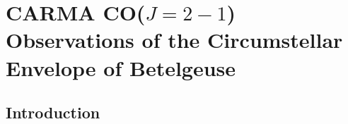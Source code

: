
\chapter{CARMA CO($J =2 - 1$) Observations of the Circumstellar \\ Envelope of Betelgeuse} \label{chap:5}

\section{Introduction}\label{sec:5.1}
